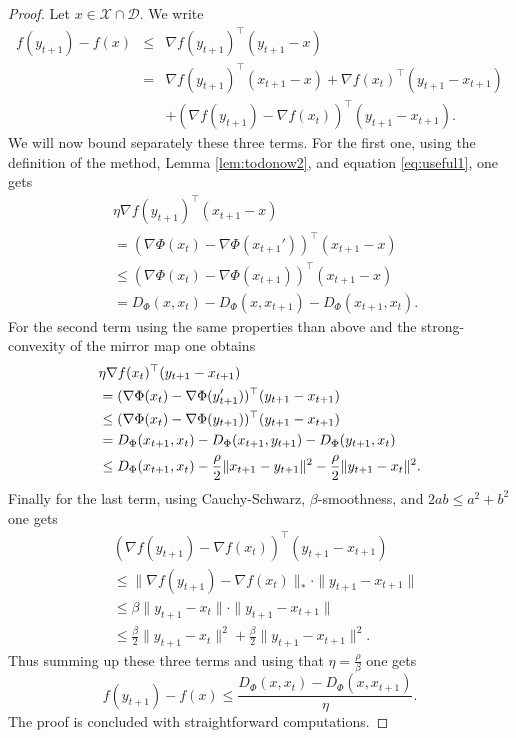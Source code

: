 \documentclass[openany]{now}
\begin{document}
\begin{proof}
Let $x \in \mathcal{X} \cap \mathcal{D}$. We write
\begin{eqnarray*}
f(y_{t+1}) - f(x) & \leq & \nabla f(y_{t+1})^{\top} (y_{t+1} - x) \\
& = & \nabla f(y_{t+1})^{\top} (x_{t+1} - x) + \nabla f(x_t)^{\top} (y_{t+1} - x_{t+1}) \\
& & + (\nabla f(y_{t+1}) - \nabla f(x_t))^{\top} (y_{t+1} - x_{t+1}) .
\end{eqnarray*}
We will now bound separately these three terms. For the first one, using the definition of the method, Lemma \ref{lem:todonow2}, and equation \eqref{eq:useful1}, one gets
\begin{align*}
& \eta \nabla f(y_{t+1})^{\top} (x_{t+1} - x) \\
& = ( \nabla \Phi(x_t) - \nabla \Phi(x_{t+1}'))^{\top} (x_{t+1} - x) \\
& \leq ( \nabla \Phi(x_t) - \nabla \Phi(x_{t+1}))^{\top} (x_{t+1} - x) \\
& = D_{\Phi}(x,x_t) - D_{\Phi}(x, x_{t+1}) - D_{\Phi}(x_{t+1}, x_t) .
\end{align*}
For the second term using the same properties than above and the strong-convexity of the mirror map one obtains
\begin{align}
& \eta \nabla f(x_t)^{\top} (y_{t+1} - x_{t+1}) \notag\\
& = ( \nabla \Phi(x_t) - \nabla \Phi(y_{t+1}'))^{\top} (y_{t+1} - x_{t+1}) \notag\\
& \leq ( \nabla \Phi(x_t) - \nabla \Phi(y_{t+1}))^{\top} (y_{t+1} - x_{t+1}) \notag\\
& = D_{\Phi}(x_{t+1},x_t) - D_{\Phi}(x_{t+1}, y_{t+1}) - D_{\Phi}(y_{t+1}, x_t) \label{eq:pourplustard1}\\
& \leq D_{\Phi}(x_{t+1},x_t) - \frac{\rho}{2} \|x_{t+1} - y_{t+1} \|^2 - \frac{\rho}{2} \|y_{t+1} - x_t\|^2 . \notag
\end{align}
Finally for the last term, using Cauchy-Schwarz, $\beta$-smoothness, and $2 ab \leq a^2 + b^2$ one gets
\begin{align*}
& (\nabla f(y_{t+1}) - \nabla f(x_t))^{\top} (y_{t+1} - x_{t+1}) \\
& \leq \|\nabla f(y_{t+1}) - \nabla f(x_t)\|_*  \cdot \|y_{t+1} - x_{t+1} \| \\
& \leq \beta \|y_{t+1} - x_t\| \cdot \|y_{t+1} - x_{t+1} \| \\
& \leq \frac{\beta}{2} \|y_{t+1} - x_t\|^2 + \frac{\beta}{2}  \|y_{t+1} - x_{t+1} \|^2 . 
\end{align*}
Thus summing up these three terms and using that $\eta = \frac{\rho}{\beta}$ one gets
$$f(y_{t+1}) - f(x) \leq \frac{D_{\Phi}(x,x_t) - D_{\Phi}(x,x_{t+1})}{\eta} .$$
The proof is concluded with straightforward computations.
\end{proof}
\end{document}
